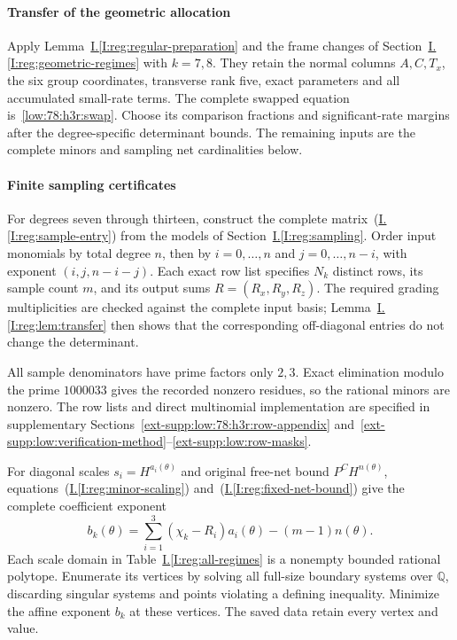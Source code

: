 \documentclass[11pt]{amsart}
\makeatletter
\theoremstyle{definition}
\theoremstyle{remark}
\numberwithin{equation}{section}
\newcommand{\equationalias}[1]{\begingroup\protected@edef\@currentlabel{\p@equation\theequation}\protected@edef\@currentHref{equation.\theHequation}\label{#1}\endgroup}
\newcommand{\partIref}[1]{\hyperref[I:#1]{I.\ref*{I:#1}}}
\newcommand{\partIeqref}[1]{\textup{(\partIref{#1})}}
\makeatother
\begin{document}
\paragraph{Transfer of the geometric allocation}\label{low:78:h3r:geometry}

Apply Lemma~\partIref{reg:regular-preparation} and the frame changes of Section~\partIref{reg:geometric-regimes} with $k=7,8$. They retain the normal columns $A,C,T_x$, the six group coordinates, transverse rank five, exact parameters and all accumulated small-rate terms. The complete swapped equation is~\eqref{low:78:h3r:swap}. Choose its comparison fractions and significant-rate margins after the degree-specific determinant bounds. The remaining inputs are the complete minors and sampling net cardinalities below.

\paragraph{Finite sampling certificates}\label{low:78:h3r:certificates}\label{reg:finite-verification}

For degrees seven through thirteen, construct the complete matrix~\partIeqref{reg:sample-entry} from the models of Section~\partIref{reg:sampling}. Order input monomials by total degree $n$, then by $i=0,\ldots,n$ and $j=0,\ldots,n-i$, with exponent $(i,j,n-i-j)$. Each exact row list specifies $N_k$ distinct rows, its sample count $m$, and its output sums $R=(R_x,R_y,R_z)$. The required grading multiplicities are checked against the complete input basis; Lemma~\partIref{reg:lem:transfer} then shows that the corresponding off-diagonal entries do not change the determinant.

All sample denominators have prime factors only $2,3$. Exact elimination modulo the prime $1000033$ gives the recorded nonzero residues, so the rational minors are nonzero. The row lists and direct multinomial implementation are specified in supplementary Sections~\ref{ext-supp:low:78:h3r:row-appendix} and~\ref{ext-supp:low:verification-method}--\ref{ext-supp:low:row-masks}.

For diagonal scales $s_i=H^{a_i(\theta)}$ and original free-net bound $P^CH^{n(\theta)}$, equations~\partIeqref{reg:minor-scaling} and~\partIeqref{reg:fixed-net-bound} give the complete coefficient exponent
\begin{equation}\label{low:finite-tail}
b_k(\theta)=\sum_{i=1}^3(\chi_k-R_i)a_i(\theta)-(m-1)n(\theta).
\end{equation}
\equationalias{low:9:root9:regular-tail}
Each scale domain in Table~\partIref{reg:all-regimes} is a nonempty bounded rational polytope. Enumerate its vertices by solving all full-size boundary systems over $\mathbb Q$, discarding singular systems and points violating a defining inequality. Minimize the affine exponent $b_k$ at these vertices. The saved data retain every vertex and value.
\end{document}
